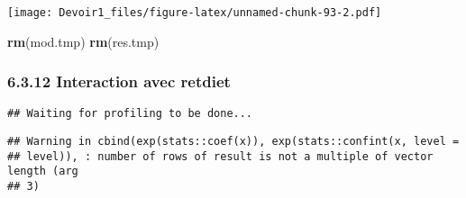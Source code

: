 \documentclass[]{article}
\newenvironment{Shaded}{\begin{snugshade}}{\end{snugshade}}
\newcommand{\KeywordTok}[1]{\textcolor[rgb]{0.13,0.29,0.53}{\textbf{#1}}}
\newcommand{\DataTypeTok}[1]{\textcolor[rgb]{0.13,0.29,0.53}{#1}}
\newcommand{\DecValTok}[1]{\textcolor[rgb]{0.00,0.00,0.81}{#1}}
\newcommand{\StringTok}[1]{\textcolor[rgb]{0.31,0.60,0.02}{#1}}
\newcommand{\OperatorTok}[1]{\textcolor[rgb]{0.81,0.36,0.00}{\textbf{#1}}}
\newcommand{\NormalTok}[1]{#1}
\begin{document}
\texttt{[image: Devoir1\_files/figure-latex/unnamed-chunk-93-2.pdf]}

\begin{Shaded}
\begin{Highlighting}[]
\KeywordTok{rm}\NormalTok{(mod.tmp)}
\KeywordTok{rm}\NormalTok{(res.tmp)}
\end{Highlighting}
\end{Shaded}

\subsubsection{6.3.12 Interaction avec
retdiet}\label{interaction-avec-retdiet}

\begin{Shaded}
\end{Shaded}

\begin{verbatim}
## Waiting for profiling to be done...
\end{verbatim}

\begin{verbatim}
## Warning in cbind(exp(stats::coef(x)), exp(stats::confint(x, level =
## level)), : number of rows of result is not a multiple of vector length (arg
## 3)
\end{verbatim}
\end{document}
